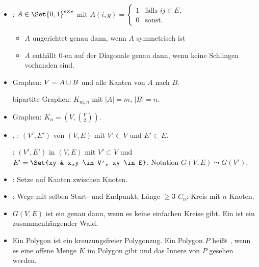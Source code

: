 \begin{df}
    \begin{itemize}
        \item
            : $A \in \Set{0,1}^{e \times e}$ mit
            \begin{math}
                A(i,y) = \begin{cases}
                    1 & \text{falls $ij \in E$}, \\
                    0 & \text{sonst}.
                \end{cases}                
            \end{math}
            \begin{itemize}
                \item
                    $A$ ungerichtet genau dann, wenn $A$ symmetrisch ist
                \item
                    $A$ enthällt $0$-en auf der Diagonale genau dann, wenn keine Schlingen vorhanden sind.
            \end{itemize}
        \item
             Graphen: $V = A \sqcup B$ und alle Kanten von $A$ nach $B$.

             bipartite Graphen: $K_{m,n}$ mit $|A| = m$, $|B| = n$.
        \item
             Graphen: $K_n = (V, \binom{V}{2})$.
        \item
            , : $(V', E')$ von $(V, E)$ mit $V' \subset V$ und $E' \subset E$.

            : $(V', E')$ in $(V, E)$ mit $V' \subset V$ und $E' = \Set{xy & x,y \in V', xy \in E}$.
            Notation $G(V,E) \leadsto G(V')$.
        \item
            : Setze auf Kanten zwischen Knoten.
        \item
            : Wege mit selben Start- und Endpunkt, Länge $\ge 3$
            $C_n$: Kreis mit $n$ Knoten.
        \item
            $G(V, E)$ ist ein  genau dann, wenn es keine einfachen Kreise gibt.
            Ein  ist ein zusammenhängender Wald.
        \item
            Ein Polygon ist ein kreuzungsfreier Polygonzug.
            Ein Polygon $P$ heißt , wenn es eine offene Menge $K$ im Polygon gibt und das Innere von $P$ gesehen werden.
    \end{itemize}
\end{df}

